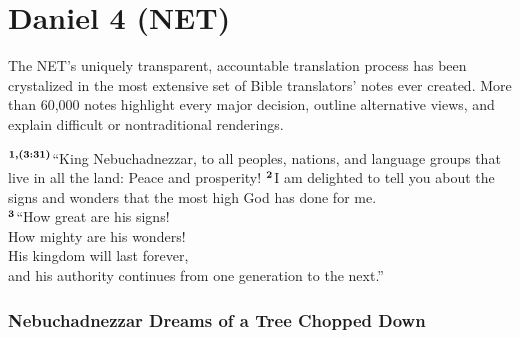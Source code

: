 \documentclass[12pt,a4paper,final]{article}
\renewcommand{\textsuperscript}[1]{\ensuremath{^{\textbf{\scriptsize #1}}}}
\begin{document}
\section*{Daniel 4 (NET)}

The NET’s uniquely transparent, accountable translation process has been crystalized in the most extensive set of Bible translators’ notes ever created. More than 60,000 notes highlight every major decision, outline alternative views, and explain difficult or nontraditional renderings.

\textsuperscript{1,(3:31)}“King Nebuchadnezzar, to all peoples, nations, and language groups that live in all the land: Peace and prosperity! \textsuperscript{2}I am delighted to tell you about the signs and wonders that the most high God has done for me.\\ 
    \textsuperscript{3}“How great are his signs! \\
    How mighty are his wonders! \\
    His kingdom will last forever, \\ 
    and his authority continues from one generation to the next.” 

\subsubsection*{Nebuchadnezzar Dreams of a Tree Chopped Down}
\end{document}
